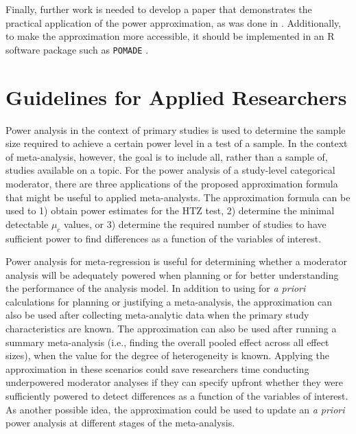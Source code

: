 Finally, further work is needed to develop a paper that demonstrates the practical application of the power approximation, as was done in \textcite{vembye2024}. Additionally, to make the approximation more accessible, it should be implemented in an R software package such as \texttt{POMADE} \autocite{POMADE}.

\section{Guidelines for Applied Researchers}


Power analysis in the context of primary studies is used to determine the sample size required to achieve a certain power level in a test of a sample. In the context of meta-analysis, however, the goal is to include all, rather than a sample of, studies available on a topic. For the power analysis of a study-level categorical moderator, there are three applications of the proposed approximation formula that might be useful to applied meta-analysts. The approximation formula can be used to 1) obtain power estimates for the HTZ test, 2) determine the minimal detectable $\mu_c$ values, or 3) determine the required number of studies to have sufficient power to find differences as a function of the variables of interest. 

Power analysis for meta-regression is useful for determining whether a moderator analysis will be adequately powered when planning or for better understanding the performance of the analysis model. In addition to using for \textit{a priori} calculations for planning or justifying a meta-analysis, the approximation can also be used after collecting meta-analytic data when the primary study characteristics are known. The approximation can also be used after running a summary meta-analysis (i.e., finding the overall pooled effect across all effect sizes), when the value for the degree of heterogeneity is known. Applying the approximation in these scenarios could save researchers time conducting underpowered moderator analyses if they can specify upfront whether they were sufficiently powered to detect differences as a function of the variables of interest. As another possible idea, the approximation could be used to update an \textit{a priori} power analysis at different stages of the meta-analysis.

